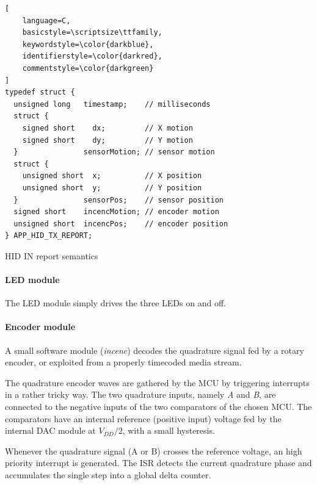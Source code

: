\documentclass[a4paper,10pt]{article}
\makeatletter
\newenvironment{figurehere}{\def\@captype{figure}\vspace{2ex}}{\vspace{2ex}}
\makeatother
\begin{document}
\begin{multicols}{2}
\begin{figurehere}
\begin{mdframed}[
	innerleftmargin=4pt,
	innerrightmargin=4pt,
	innertopmargin=0pt,
	innerbottommargin=0pt
]
\begin{lstlisting}[
	language=C,
	basicstyle=\scriptsize\ttfamily,
	keywordstyle=\color{darkblue},
	identifierstyle=\color{darkred},
	commentstyle=\color{darkgreen}
]
typedef struct {
  unsigned long   timestamp;    // milliseconds
  struct {
    signed short    dx;         // X motion
    signed short    dy;         // Y motion
  }               sensorMotion; // sensor motion
  struct {
    unsigned short  x;          // X position
    unsigned short  y;          // Y position
  }               sensorPos;    // sensor position
  signed short    incencMotion; // encoder motion
  unsigned short  incencPos;    // encoder position
} APP_HID_TX_REPORT;
\end{lstlisting}
\end{mdframed}
\caption{HID IN report semantics}
\label{fig:hid_rpt_struct}
\end{figurehere}



\paragraph{LED module}
The LED module simply drives the three LEDs on and off.


\paragraph{Encoder module}
A small software module (\emph{incenc}) decodes the quadrature signal fed by a
rotary encoder, or exploited from a properly timecoded media stream.

The quadrature encoder waves are gathered by the MCU by triggering interrupts
in a rather tricky way. The two quadrature inputs, namely \emph{A} and
\emph{B}, are connected to the negative inputs of the two comparators of the
chosen MCU. The comparators have an internal reference (positive input)
voltage fed by the internal DAC module at $V_{DD}/2$, with a small hysteresis.

Whenever the quadrature signal (A or B) crosses the reference voltage, an
high priority interrupt is generated. The ISR detects the current quadrature
phase and accumulates the single step into a global delta counter.


\end{multicols}
\end{document}
